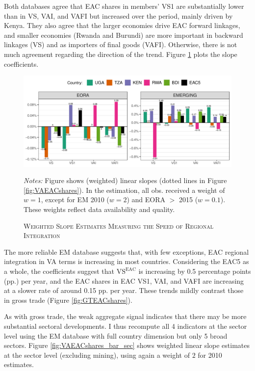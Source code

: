 \documentclass[a4paper]{article}
\begin{document}
Both databases agree that EAC shares in members' VS1 are substantially lower than in VS, VAI, and VAFI but increased over the period, mainly driven by Kenya. They also agree that the larger economies drive EAC forward linkages, and smaller economies (Rwanda and Burundi) are more important in backward linkages (VS) and as importers of final goods (VAFI). Otherwise, there is not much agreement regarding the direction of the trend. Figure \ref{fig:VAEACshares_bar} plots the slope coefficients.


\begin{figure}[h!] \vspace{-1mm}
\centering
\caption{\label{fig:VAEACshares_bar}\textsc{Weighted Slope Estimates Measuring the Speed of Regional Integration}}
\includegraphics[width=1\textwidth, trim= {0 0 0 0}, clip]{"VA_EAC5_shares_slope_bar.pdf"} \\ 
\raggedright
\scriptsize
\emph{Notes:} Figure shows (weighted) linear slopes (dotted lines in Figure \ref{fig:VAEACshares}). In the estimation, all obs. received a weight of $w=1$, except for EM 2010 ($w=2$) and EORA $>$ 2015 ($w=0.1$). These weights reflect data availability and quality.  
 \vspace{-4mm}
\end{figure}
\FloatBarrier

 The more reliable EM database suggests that, with few exceptions, EAC regional integration in VA terms is increasing in most countries. Considering the EAC5 as a whole, the coefficients suggest that $\text{VS}^\text{EAC}$ is increasing by 0.5 percentage points (pp.) per year, and the EAC shares in EAC VS1, VAI, and VAFI are increasing at a slower rate of around 0.15 pp. per year. These trends mildly contrast those in gross trade (Figure \ref{fig:GTEACshares}). \newline

As with gross trade, the weak aggregate signal indicates that there may be more substantial sectoral developments. I thus recompute all 4 indicators at the sector level using the EM database with full country dimension but only 5 broad sectors. Figure \ref{fig:VAEACshares_bar_sec} shows weighted linear slope estimates at the sector level (excluding mining), using again a weight of $2$ for 2010 estimates. 
\end{document}
